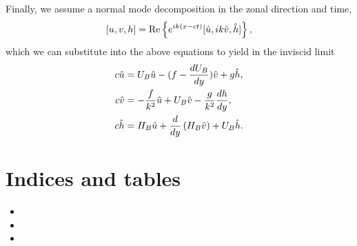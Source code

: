 \documentclass[letterpaper,10pt,english]{sphinxmanual}
\begin{document}
Finally, we assume a normal mode decomposition in the zonal direction
and time,
\begin{gather}
\begin{split}\begin{aligned}
[u, v, h] = \mbox{Re}\left\{ e^{ik(x - c t)} [\hat u, ik \hat v, \hat h] \right\},\end{aligned}\end{split}\notag
\end{gather}
which we can substitute into the above equations to yield in the
inviscid limit
\begin{gather}
\begin{split}\begin{aligned}
c \hat u  &  = U_B \hat u - (f - \frac{dU_B}{dy}) \hat v + g \hat h, \\
c \hat v  &  =- \frac{f}{k^2} \hat u + U_B \hat v -\frac{ g}{k^2} \frac{d h}{d y}, \\
c \hat h  &=   H_B \hat u  +  \frac{d}{d y}\left(H_B \hat v\right) +  U_B \hat h.\end{aligned}\end{split}\notag
\end{gather}

\chapter{Indices and tables}
\label{index:indices-and-tables}\begin{itemize}
\item {} 

\item {} 

\item {} 

\end{itemize}



\renewcommand{\indexname}{Index}
\printindex
\end{document}
